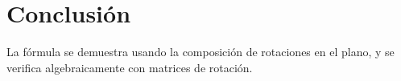 \documentclass{article}
\begin{document}

\pagecolor{carne}

\newpage

\pagecolor{white}

\newpage

\pagecolor{carne}

\newpage

\pagecolor{white}

\newpage

\pagecolor{carne}

\newpage

\pagecolor{white}

\newpage

\pagecolor{carne}

\newpage

\pagecolor{white}

\newpage

\pagecolor{carne}

\newpage

\pagecolor{white}

\newpage

\pagecolor{white}
\section{Conclusión}\label{sec:conclusion}
La fórmula se demuestra usando la composición de rotaciones en el plano, y se verifica algebraicamente con matrices de rotación.
\end{document}
